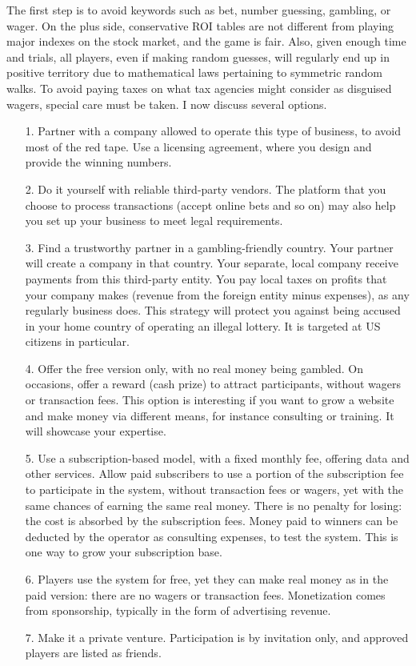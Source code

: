 \documentclass[oneside,10pt]{book}
\begin{document}
The first step is to avoid keywords such as bet, number guessing, gambling, or wager. On the plus side, conservative ROI tables are not different from playing major indexes on the stock market, and the game is fair. Also, given enough time and trials, all players, even if making random guesses, will regularly end up in positive territory due to mathematical laws pertaining to symmetric random walks. To avoid paying taxes on what tax agencies might consider as disguised wagers, special care must be taken. I now discuss
 several  options.\vspace{1ex}

\begin{itemize}
\item[1.] Partner with a company allowed to operate this type of business, to avoid most of the red tape. Use a licensing agreement, where you design and provide the winning numbers.
\item[2.] Do it yourself with reliable third-party vendors. The platform that you choose to process transactions (accept online bets and so on) may also help you set up your business to meet legal requirements.
\item[3.] Find a trustworthy partner in a gambling-friendly country. Your partner will create a company in that country. Your separate, local company receive payments from this third-party entity. You pay local taxes on profits that your company makes (revenue from the foreign entity minus expenses), as any regularly business does. This strategy will protect you against being accused in your home country of operating an illegal lottery.  It is targeted at US citizens in particular.
\item[4.] Offer the free version only, with no real money being gambled. On occasions, offer a reward (cash prize) to attract participants,
 without  wagers or transaction fees. This option is interesting if you want to grow a website and make money via different means, for instance consulting or training. It will showcase your expertise.
\item[5.] Use a subscription-based model, with a fixed monthly fee, offering data and other services. Allow paid subscribers to use
 a portion of the subscription fee to participate in the system, without transaction fees or wagers, yet with the same chances of earning the same real money. There is no penalty for losing: the cost is absorbed by the subscription fees.  Money paid to winners can be deducted by the operator as consulting expenses, to test the system. This is one way to grow your subscription base.
\item[6.] Players use the system for free,  yet they can make real money as in the paid version: there are no wagers or transaction fees. Monetization comes from sponsorship, typically in the form of advertising revenue.
\item[7.] Make it a private venture. Participation is by invitation only, and approved players are listed as friends.
\end{itemize}\vspace{1ex}
\end{document}
